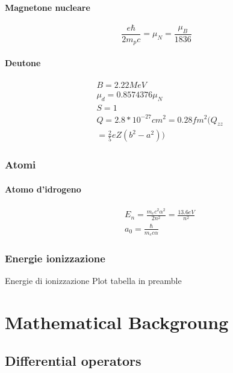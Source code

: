 \subsection{Magnetone nucleare}
 
\begin{equation*}
\frac{e\hbar}{2m_pc}=\mu_N=\frac{\mu_B}{1836}
\end{equation*}
 
\subsection{Deutone}
 
\begin{align*}
&B=2.22 MeV\\
&\mu_d=0.8574376\mu_N\\
&S=1\\
&Q=2.8*10^{-27}cm^2=0.28fm^2(Q_{zz}\\
&=\frac{2}{5}eZ(b^2-a^2))
\end{align*}
 
\section{Atomi}

\subsection{Atomo d'idrogeno}

\begin{align*}
&E_n=\frac{m_ec^2\alpha^2}{2n^2}=\frac{13.6eV}{n^2}\\
&a_0=\frac{\hbar}{m_ec\alpha}
 \end{align*}

\section{Energie ionizzazione}
 
\begin{todo}{Energie di ionizzazione}
Plot tabella in preamble
\end{todo}

\part{Mathematical Backgroung}

\chapter{Differential operators}
\PartialToc


